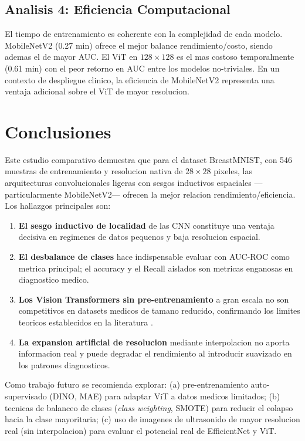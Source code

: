 \documentclass[12pt, a4paper]{article}
\begin{document}
\subsection{Analisis 4: Eficiencia Computacional}

El tiempo de entrenamiento es coherente con la complejidad de cada modelo. MobileNetV2 (0.27 min) ofrece el mejor balance rendimiento/costo, siendo ademas el de mayor AUC. El ViT en $128\times128$ es el mas costoso temporalmente (0.61 min) con el peor retorno en AUC entre los modelos no-triviales. En un contexto de despliegue clinico, la eficiencia de MobileNetV2 representa una ventaja adicional sobre el ViT de mayor resolucion.

\section{Conclusiones}

Este estudio comparativo demuestra que para el dataset BreastMNIST, con 546 muestras de entrenamiento y resolucion nativa de $28\times28$ pixeles, las arquitecturas convolucionales ligeras con sesgos inductivos espaciales ---particularmente MobileNetV2--- ofrecen la mejor relacion rendimiento/eficiencia. Los hallazgos principales son:

\begin{enumerate}
    \item \textbf{El sesgo inductivo de localidad} de las CNN constituye una ventaja decisiva en regimenes de datos pequenos y baja resolucion espacial.
    \item \textbf{El desbalance de clases} hace indispensable evaluar con AUC-ROC como metrica principal; el accuracy y el Recall aislados son metricas enganosas en diagnostico medico.
    \item \textbf{Los Vision Transformers sin pre-entrenamiento} a gran escala no son competitivos en datasets medicos de tamano reducido, confirmando los limites teoricos establecidos en la literatura \citep{dosovitskiy2021vit}.
    \item \textbf{La expansion artificial de resolucion} mediante interpolacion no aporta informacion real y puede degradar el rendimiento al introducir suavizado en los patrones diagnosticos.
\end{enumerate}

Como trabajo futuro se recomienda explorar: (a) pre-entrenamiento auto-supervisado (DINO, MAE) para adaptar ViT a datos medicos limitados; (b) tecnicas de balanceo de clases (\textit{class weighting}, SMOTE) para reducir el colapso hacia la clase mayoritaria; (c) uso de imagenes de ultrasonido de mayor resolucion real (sin interpolacion) para evaluar el potencial real de EfficientNet y ViT.
\end{document}

